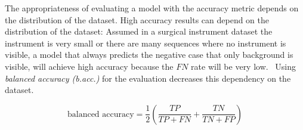 The appropriateness of evaluating a model with the accuracy metric depends on the distribution of the dataset. High accuracy results can depend on the distribution of the dataset: Assumed in a surgical instrument dataset the instrument is very small or there are many sequences where no instrument is visible, a model that always predicts the negative case that only background is visible, will achieve high accuracy because the $FN$ rate will be very low.~\cite{metz1987accuracyROC}
Using \emph{balanced accuracy (b.acc.)} for the evaluation decreases this dependency on the dataset.~\cite{balanced_accuracy2010brodersen}

\begin{equation}
\label{eq:balanced_accuracy}
\text{balanced accuracy}=\frac{1}{2}\left(\frac{TP}{TP+FN}+\frac{TN}{TN+FP}\right)
\end{equation}



